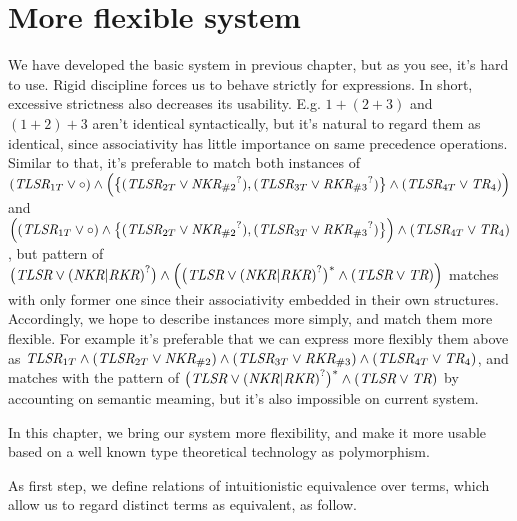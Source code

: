 \documentclass[12pt]{article}
\begin{document}
\section{More flexible system}
We have developed the basic system in previous chapter,
but as you see, it's hard to use. Rigid discipline forces us to behave
strictly for expressions. In short, excessive strictness also
decreases its usability. E.g. $1+(2+3)$ and $(1+2)+3$ aren't identical
syntactically,
but it's natural to regard them as identical, since associativity has little
importance on same precedence operations. Similar to that, it's preferable
to match both instances of
$(\text{\it TLSR}_{1T} \vee \circ) \wedge \Bigl(\bigl\{
(\text{\it TLSR}_{2T} \vee {\text{\it NKR}_{\#2}}^?),
(\text{\it TLSR}_{3T} \vee {\text{\it RKR}_{\#3}}^?)\bigr\} \wedge
(\text{\it TLSR}_{4T} \vee \text{\it TR}_{4}) \Bigr)$ and
$\Bigl((\text{\it TLSR}_{1T} \vee \circ) \wedge \bigl\{
(\text{\it TLSR}_{2T} \vee {\text{\it NKR}_{\#2}}^?),
(\text{\it TLSR}_{3T} \vee {\text{\it RKR}_{\#3}}^?)\bigr\} \Bigr) \wedge
(\text{\it TLSR}_{4T} \vee \text{\it TR}_{4})$, but pattern of
$\bigl(\text{\it TLSR} \vee {(\text{\it NKR} | \text{\it RKR})}^? \bigr)
\wedge \Bigl(\bigl(\text{\it TLSR} \vee {(\text{\it NKR} | \text{\it RKR})}^?
\bigr)^* \wedge (\text{\it TLSR} \vee \text{\it TR}) \Bigr)$
matches with only former one since their associativity embedded in their
own structures. Accordingly, we hope to describe instances more simply, and
match them more flexible. For example it's preferable that we can express
more flexibly them above as
$\text{\it TLSR}_{1T} \wedge (\text{\it TLSR}_{2T} \vee
\text{\it NKR}_{\#2}) \wedge (\text{\it TLSR}_{3T} \vee
\text{\it RKR}_{\#3}) \wedge (\text{\it TLSR}_{4T} \vee
\text{\it TR}_{4})$, and matches with the pattern of
$\bigl(\text{\it TLSR} \vee {(\text{\it NKR} | \text{\it RKR})}^? \bigr)^*
\wedge (\text{\it TLSR} \vee \text{\it TR})$
by accounting on semantic meaming, but it's also impossible on
current system.

In this chapter, we bring our system more flexibility, and make it more
usable based on a well known type theoretical technology as polymorphism.

As first step, we define relations of intuitionistic equivalence over
terms, which allow us to regard distinct terms as equivalent, as follow.
\end{document}
